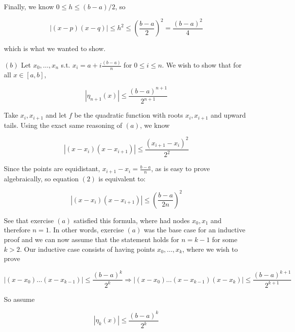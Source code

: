 \documentclass[12pt]{article}
\theoremstyle{definition}
\begin{document}
Finally, we know $0 \leq h \leq (b-a) / 2$, so


\begin{equation*}
    \left| (x-p)(x-q) \right|  \leq h^2 \leq \left( \frac{b-a}{2} \right)^2 =
    \frac{(b-a)^2}{4}
\end{equation*}

which is what we wanted to show.

$(b)$ Let $x_0, \ldots, x_n$ s.t. $x_i = a + i\frac{(b-a)}{n}$ for $0 \leq i
\leq n$. We wish to show that for all $x \in [a, b]$,

\begin{equation*}
    \left| \eta_{n+1}(x) \right| \leq \frac{(b-a)^{n+1}}{2^{n+1}}
\end{equation*}

Take $x_i, x_{i+1}$ and let $f$ be the quadratic function with roots $x_i,
x_{i+1}$ and upward tails. Using the exact same reasoning of $(a)$, we know 

\begin{equation}
    \left| (x - x_i)(x - x_{i+1}) \right| \leq \frac{(x_{i+1} - x_{i})^2}{2^2}
\end{equation}

Since the points are equidistant, $x_{i+1} - x_{i} =  \frac{b-a}{n}$, as is easy to
prove algebraically, so equation $(2)$ is equivalent to:

\begin{equation}
    \left| (x-x_i)(x-x_{i+1}) \right| \leq \left( \frac{b-a}{2n} \right)^2
\end{equation}

See that exercise $(a)$ satisfied this formula, where had nodes $x_0, x_1$ and
therefore $n = 1$. In other words, exercise $(a)$ was the base case for an
inductive proof and we can now assume that the statement holds for $n = k - 1$
for some $k > 2$. Our inductive case consists of having points $x_0, \ldots, x_k$, where we wish to prove 

\begin{equation*}
    \left| (x - x_0)\ldots (x-x_{k-1}) \right| \leq \frac{ (b-a)^{k} }{2^{k}}
    \Rightarrow \left| (x-x_0)\ldots(x-x_{k-1})(x-x_k) \right| \leq
    \frac{(b-a)^{k+1}}{2^{k+1}}
\end{equation*}

So assume 

\begin{equation*}
    \left| \eta_{k}(x) \right| \leq \frac{(b-a)^k}{2^k}
\end{equation*}
\end{document}
